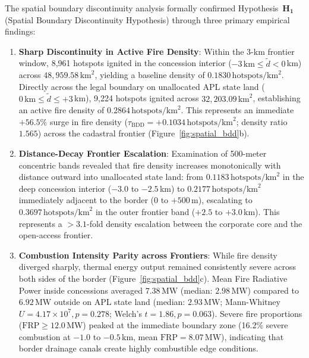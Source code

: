 The spatial boundary discontinuity analysis formally confirmed Hypothesis~$\mathbf{H_1}$ (Spatial Boundary Discontinuity Hypothesis) through three primary empirical findings:
\begin{enumerate}
    \item \textbf{Sharp Discontinuity in Active Fire Density}: Within the 3-km frontier window, 8,961 hotspots ignited in the concession interior ($-3\,\text{km} \le \tilde{d} < 0$\,km) across $48,959.58\,\text{km}^2$, yielding a baseline density of $0.1830\,\text{hotspots}/\text{km}^2$. Directly across the legal boundary on unallocated APL state land ($0\,\text{km} \le \tilde{d} \le +3$\,km), 9,224 hotspots ignited across $32,203.09\,\text{km}^2$, establishing an active fire density of $0.2864\,\text{hotspots}/\text{km}^2$. This represents an immediate $+56.5\%$ surge in fire density ($\tau_{\text{BDD}} = +0.1034\,\text{hotspots}/\text{km}^2$; density ratio $1.565$) across the cadastral frontier (Figure~\ref{fig:spatial_bdd}b).
    \item \textbf{Distance-Decay Frontier Escalation}: Examination of 500-meter concentric bands revealed that fire density increases monotonically with distance outward into unallocated state land: from $0.1183\,\text{hotspots}/\text{km}^2$ in the deep concession interior ($-3.0$ to $-2.5$\,km) to $0.2177\,\text{hotspots}/\text{km}^2$ immediately adjacent to the border ($0$ to $+500$\,m), escalating to $0.3697\,\text{hotspots}/\text{km}^2$ in the outer frontier band ($+2.5$ to $+3.0$\,km). This represents a $>3.1$-fold density escalation between the corporate core and the open-access frontier.
    \item \textbf{Combustion Intensity Parity across Frontiers}: While fire density diverged sharply, thermal energy output remained consistently severe across both sides of the border (Figure~\ref{fig:spatial_bdd}c). Mean Fire Radiative Power inside concessions averaged $7.38\,\text{MW}$ (median: $2.98\,\text{MW}$) compared to $6.92\,\text{MW}$ outside on APL state land (median: $2.93\,\text{MW}$; Mann-Whitney $U = 4.17 \times 10^7, p = 0.278$; Welch's $t = 1.86, p = 0.063$). Severe fire proportions ($\text{FRP} \ge 12.0$\,MW) peaked at the immediate boundary zone (16.2\% severe combustion at $-1.0$ to $-0.5$\,km, mean $\text{FRP} = 8.07\,\text{MW}$), indicating that border drainage canals create highly combustible edge conditions.
\end{enumerate}

